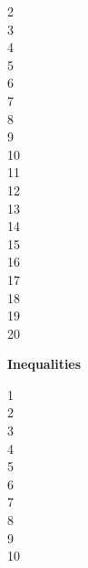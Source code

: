 2 \\


3 \\


4 \\


5 \\


6 \\


7 \\


8 \\


9 \\


10 \\


11 \\


12 \\


13 \\


14 \\


15 \\


16 \\


17 \\


18 \\


19 \\


20 \\


\newpage

\textbf{Inequalities}

1 \\


2 \\


3 \\


4 \\


5 \\


6 \\


7 \\


8 \\


9 \\


10 \\


